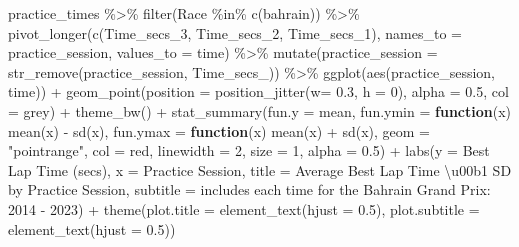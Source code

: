 \documentclass[
]{book}
\newenvironment{Shaded}{\begin{snugshade}}{\end{snugshade}}
\newcommand{\AttributeTok}[1]{\textcolor[rgb]{0.77,0.63,0.00}{#1}}
\newcommand{\ControlFlowTok}[1]{\textcolor[rgb]{0.13,0.29,0.53}{\textbf{#1}}}
\newcommand{\DecValTok}[1]{\textcolor[rgb]{0.00,0.00,0.81}{#1}}
\newcommand{\FloatTok}[1]{\textcolor[rgb]{0.00,0.00,0.81}{#1}}
\newcommand{\FunctionTok}[1]{\textcolor[rgb]{0.00,0.00,0.00}{#1}}
\newcommand{\NormalTok}[1]{#1}
\newcommand{\SpecialCharTok}[1]{\textcolor[rgb]{0.00,0.00,0.00}{#1}}
\newcommand{\StringTok}[1]{\textcolor[rgb]{0.31,0.60,0.02}{#1}}
\begin{document}
\begin{Shaded}
\begin{Highlighting}[]
\NormalTok{practice\_times }\SpecialCharTok{\%\textgreater{}\%}
  \FunctionTok{filter}\NormalTok{(Race }\SpecialCharTok{\%in\%} \FunctionTok{c}\NormalTok{(}\StringTok{\textquotesingle{}bahrain\textquotesingle{}}\NormalTok{)) }\SpecialCharTok{\%\textgreater{}\%} 
  \FunctionTok{pivot\_longer}\NormalTok{(}\FunctionTok{c}\NormalTok{(Time\_secs\_3, Time\_secs\_2, Time\_secs\_1), }\AttributeTok{names\_to =} \StringTok{\textquotesingle{}practice\_session\textquotesingle{}}\NormalTok{, }\AttributeTok{values\_to =} \StringTok{\textquotesingle{}time\textquotesingle{}}\NormalTok{) }\SpecialCharTok{\%\textgreater{}\%}
  \FunctionTok{mutate}\NormalTok{(}\AttributeTok{practice\_session =} \FunctionTok{str\_remove}\NormalTok{(practice\_session, }\StringTok{\textquotesingle{}Time\_secs\_\textquotesingle{}}\NormalTok{)) }\SpecialCharTok{\%\textgreater{}\%}
  \FunctionTok{ggplot}\NormalTok{(}\FunctionTok{aes}\NormalTok{(practice\_session, time)) }\SpecialCharTok{+}
  \FunctionTok{geom\_point}\NormalTok{(}\AttributeTok{position =} \FunctionTok{position\_jitter}\NormalTok{(}\AttributeTok{w=} \FloatTok{0.3}\NormalTok{, }\AttributeTok{h =} \DecValTok{0}\NormalTok{), }\AttributeTok{alpha =} \FloatTok{0.5}\NormalTok{, }\AttributeTok{col =} \StringTok{\textquotesingle{}grey\textquotesingle{}}\NormalTok{) }\SpecialCharTok{+}
  \FunctionTok{theme\_bw}\NormalTok{() }\SpecialCharTok{+}
  \FunctionTok{stat\_summary}\NormalTok{(}\AttributeTok{fun.y =}\NormalTok{ mean,}
               \AttributeTok{fun.ymin =} \ControlFlowTok{function}\NormalTok{(x) }\FunctionTok{mean}\NormalTok{(x) }\SpecialCharTok{{-}} \FunctionTok{sd}\NormalTok{(x), }
               \AttributeTok{fun.ymax =} \ControlFlowTok{function}\NormalTok{(x) }\FunctionTok{mean}\NormalTok{(x) }\SpecialCharTok{+} \FunctionTok{sd}\NormalTok{(x), }
               \AttributeTok{geom =} \StringTok{"pointrange"}\NormalTok{, }
               \AttributeTok{col =} \StringTok{\textquotesingle{}red\textquotesingle{}}\NormalTok{, }\AttributeTok{linewidth =} \DecValTok{2}\NormalTok{, }\AttributeTok{size =} \DecValTok{1}\NormalTok{, }\AttributeTok{alpha =} \FloatTok{0.5}\NormalTok{) }\SpecialCharTok{+}
  \FunctionTok{labs}\NormalTok{(}\AttributeTok{y =} \StringTok{\textquotesingle{}Best Lap Time (secs)\textquotesingle{}}\NormalTok{,}
       \AttributeTok{x =} \StringTok{\textquotesingle{}Practice Session\textquotesingle{}}\NormalTok{,}
       \AttributeTok{title =} \StringTok{\textquotesingle{}Average Best Lap Time \textbackslash{}u00b1 SD by Practice Session\textquotesingle{}}\NormalTok{,}
       \AttributeTok{subtitle =} \StringTok{\textquotesingle{}includes each time for the Bahrain Grand Prix: 2014 {-} 2023\textquotesingle{}}\NormalTok{) }\SpecialCharTok{+}
  \FunctionTok{theme}\NormalTok{(}\AttributeTok{plot.title =} \FunctionTok{element\_text}\NormalTok{(}\AttributeTok{hjust =} \FloatTok{0.5}\NormalTok{),}
        \AttributeTok{plot.subtitle =} \FunctionTok{element\_text}\NormalTok{(}\AttributeTok{hjust =} \FloatTok{0.5}\NormalTok{))}
\end{Highlighting}
\end{Shaded}
\end{document}
